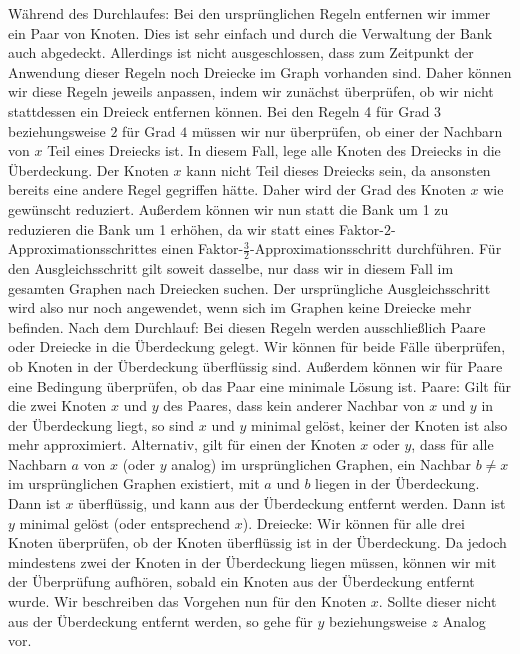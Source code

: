 \documentclass[12pt,onecolumn, notitlepage]{scrartcl}
\begin{document}
Während des Durchlaufes:\newline
Bei den ursprünglichen Regeln entfernen wir immer ein Paar von Knoten. Dies ist sehr einfach und durch die Verwaltung der Bank auch abgedeckt. Allerdings ist nicht ausgeschlossen, dass zum Zeitpunkt der Anwendung dieser Regeln noch Dreiecke im Graph vorhanden sind. Daher können wir diese Regeln jeweils anpassen, indem wir zunächst überprüfen, ob wir nicht stattdessen ein Dreieck entfernen können. Bei den Regeln 4 für Grad $3$ beziehungsweise $2$ für Grad $4$ müssen wir nur überprüfen, ob einer der Nachbarn von $x$ Teil eines Dreiecks ist. In diesem Fall, lege alle Knoten des Dreiecks in die Überdeckung. Der Knoten $x$ kann nicht Teil dieses Dreiecks sein, da ansonsten bereits eine andere Regel gegriffen hätte. Daher wird der Grad des Knoten $x$ wie gewünscht reduziert. Außerdem können wir nun statt die Bank um 1 zu reduzieren die Bank um 1 erhöhen, da wir statt eines Faktor-$2$-Approximationsschrittes einen Faktor-$\frac{3}{2}$-Approximationsschritt durchführen. Für den Ausgleichsschritt gilt soweit dasselbe, nur dass wir in diesem Fall im gesamten Graphen nach Dreiecken suchen. Der ursprüngliche Ausgleichsschritt wird also nur noch angewendet, wenn sich im Graphen keine Dreiecke mehr befinden.  \newline\newline
Nach dem Durchlauf:\newline
Bei diesen Regeln werden ausschließlich Paare oder Dreiecke in die Überdeckung gelegt. Wir können für beide Fälle überprüfen, ob Knoten in der Überdeckung überflüssig sind. Außerdem können wir für Paare eine Bedingung überprüfen, ob das Paar eine minimale Lösung ist.\newline\newline
Paare: \newline
Gilt für die zwei Knoten $x$ und $y$ des Paares, dass kein anderer Nachbar von $x$ und $y$ in der Überdeckung liegt, so sind $x$ und $y$ minimal gelöst, keiner der Knoten ist also mehr approximiert.
Alternativ, gilt für einen der Knoten $x$ oder $y$, dass für alle Nachbarn $a$ von $x$ (oder $y$ analog) im ursprünglichen Graphen, ein Nachbar $b \neq x$ im ursprünglichen Graphen existiert, mit $a$ und $b$ liegen in der Überdeckung. Dann ist $x$ überflüssig, und kann aus der Überdeckung entfernt werden. Dann ist $y$ minimal gelöst (oder entsprechend $x$). \newline\newline
Dreiecke:\newline
Wir können für alle drei Knoten überprüfen, ob der Knoten überflüssig ist in der Überdeckung. Da jedoch mindestens zwei der Knoten in der Überdeckung liegen müssen, können wir mit der Überprüfung aufhören, sobald ein Knoten aus der Überdeckung entfernt wurde. Wir beschreiben das Vorgehen nun für den Knoten $x$. Sollte dieser nicht aus der Überdeckung entfernt werden, so gehe für $y$ beziehungsweise $z$ Analog vor.\newline
\end{document}
